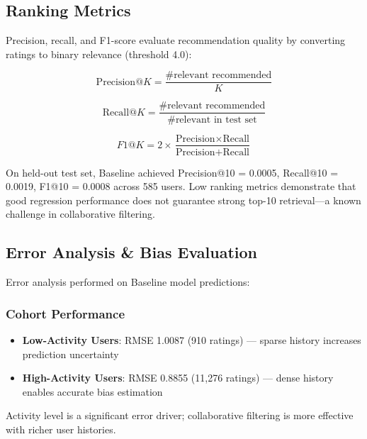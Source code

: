 \documentclass[11pt,a4paper]{article}
\begin{document}
\subsection{Ranking Metrics}

Precision, recall, and F1-score evaluate recommendation quality by converting ratings to binary relevance (threshold 4.0):

\begin{equation}
\text{Precision@}K = \frac{\text{\# relevant recommended}}{K}
\end{equation}

\begin{equation}
\text{Recall@}K = \frac{\text{\# relevant recommended}}{\text{\# relevant in test set}}
\end{equation}

\begin{equation}
F1@K = 2 \times \frac{\text{Precision} \times \text{Recall}}{\text{Precision} + \text{Recall}}
\end{equation}

On held-out test set, Baseline achieved Precision@10 = 0.0005, Recall@10 = 0.0019, F1@10 = 0.0008 across 585 users. Low ranking metrics demonstrate that good regression performance does not guarantee strong top-10 retrieval—a known challenge in collaborative filtering.

\subsection{Error Analysis \& Bias Evaluation}

Error analysis performed on Baseline model predictions:

\subsubsection{Cohort Performance}

\begin{itemize}
    \item \textbf{Low-Activity Users}: RMSE 1.0087 (910 ratings) — sparse history increases prediction uncertainty
    \item \textbf{High-Activity Users}: RMSE 0.8855 (11,276 ratings) — dense history enables accurate bias estimation
\end{itemize}

Activity level is a significant error driver; collaborative filtering is more effective with richer user histories.
\end{document}
